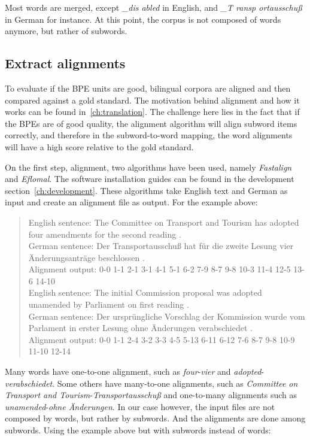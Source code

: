 Most words are merged, except \emph{\_dis abled} in English, and \emph{\_T ransp ortausschuß} in German for instance. At this point, the corpus is not composed of words anymore, but rather of subwords.

\subsection{Extract alignments}\label{subsec:extractalign}

To evaluate if the BPE units are good, bilingual corpora are aligned  and then compared against a gold standard. The motivation behind alignment and how it works can be found in~\ref{ch:translation}. The challenge here lies in the fact that if the BPEs are of good quality, the alignment algorithm will align subword items correctly, and therefore in the subword-to-word mapping, the word alignments will have a high score relative to the gold standard.

On the first step, alignment, two algorithms have been used, namely \emph{Fastalign} and \emph{Eflomal}. The software installation guides can be found in the development section~\ref{ch:development}. These algorithms take English text and German as input and create an alignment file as output. For the example above:

\begin{quote}
	English sentence: The Committee on Transport and Tourism has adopted four amendments for the second reading .\\
	German sentence: Der Transportausschuß hat für die zweite Lesung vier Änderungsanträge beschlossen .\\
	Alignment output: 0-0 1-1 2-1 3-1 4-1 5-1 6-2 7-9 8-7 9-8 10-3 11-4 12-5 13-6 14-10\\

	English sentence: The initial Commission proposal was adopted unamended by Parliament on first reading .\\
	German sentence: Der ursprüngliche Vorschlag der Kommission wurde vom Parlament in erster Lesung ohne Änderungen verabschiedet .\\
	Alignment output: 0-0 1-1 2-4 3-2 3-3 4-5 5-13 6-11 6-12 7-6 8-7 9-8 10-9 11-10 12-14
\end{quote}

\clearpage
Many words have one-to-one alignment, such as \emph{four}-\emph{vier} and \emph{adopted}-\emph{verabschiedet}. Some others have many-to-one alignments, such as \emph{Committee on Transport and Tourism}-\emph{Transportausschuß} and one-to-many alignments such as \emph{unamended}-\emph{ohne Änderungen}. In our case however, the input files are not composed by words, but rather by subwords. And the alignments are done among subwords. Using the example above but with subwords instead of words:

